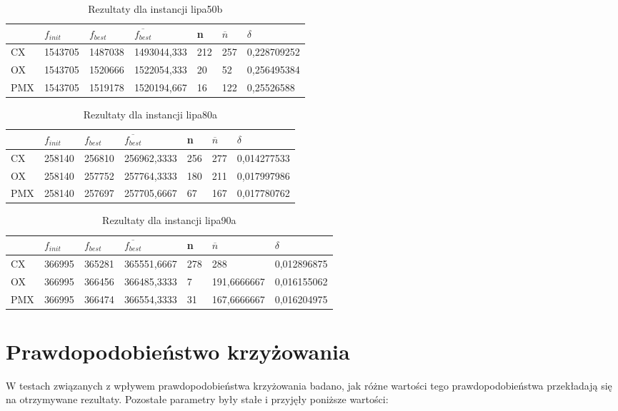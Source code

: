 \begin{table}[H]
\label{T2_lipa50b}
\begin{tabular}{l l l l l l l}
\hline
 & $f_{init}$ & $f_{best}$ & $\overline{f_{best}}$ & n & $\overline{n}$ & $\delta$ \\
\hline
CX & 1543705 & 1487038 & 1493044,333 & 212 & 257 & 0,228709252\\
OX & 1543705 & 1520666 & 1522054,333 & 20 & 52 & 0,256495384\\
PMX & 1543705 & 1519178 & 1520194,667 & 16 & 122 & 0,25526588\\
\hline
\end{tabular}
\caption{Rezultaty dla instancji lipa50b}
\end{table}

\begin{table}[H]
\label{T2_lipa80a}
\begin{tabular}{l l l l l l l}
\hline
 & $f_{init}$ & $f_{best}$ & $\overline{f_{best}}$ & n & $\overline{n}$ & $\delta$ \\
\hline
CX & 258140 & 256810 & 256962,3333 & 256 & 277 & 0,014277533\\
OX & 258140 & 257752 & 257764,3333 & 180 & 211 & 0,017997986\\
PMX & 258140 & 257697 & 257705,6667 & 67 & 167 & 0,017780762\\
\hline
\end{tabular}
\caption{Rezultaty dla instancji lipa80a}
\end{table}

\begin{table}[H]
\label{T2_lipa90a}
\begin{tabular}{l l l l l l l}
\hline
 & $f_{init}$ & $f_{best}$ & $\overline{f_{best}}$ & n & $\overline{n}$ & $\delta$ \\
\hline
CX & 366995 & 365281 & 365551,6667 & 278 & 288 & 0,012896875\\
OX & 366995 & 366456 & 366485,3333 & 7 & 191,6666667 & 0,016155062\\
PMX	& 366995 & 366474 & 366554,3333 & 31 & 167,6666667 & 0,016204975\\
\hline
\end{tabular}
\caption{Rezultaty dla instancji lipa90a}
\end{table}

\section{Prawdopodobieństwo krzyżowania}
W testach związanych z wpływem prawdopodobieństwa krzyżowania badano, jak różne wartości tego prawdopodobieństwa przekładają się na otrzymywane rezultaty. Pozostałe parametry były stałe i przyjęły poniższe wartości:

